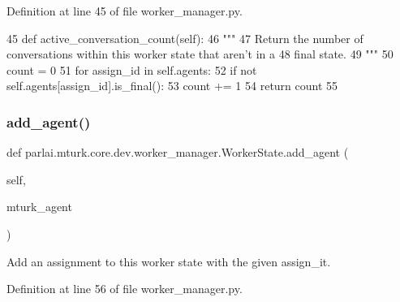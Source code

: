 Definition at line 45 of file worker\+\_\+manager.\+py.


\begin{DoxyCode}
45     \textcolor{keyword}{def }active\_conversation\_count(self):
46         \textcolor{stringliteral}{"""}
47 \textcolor{stringliteral}{        Return the number of conversations within this worker state that aren't in a}
48 \textcolor{stringliteral}{        final state.}
49 \textcolor{stringliteral}{        """}
50         count = 0
51         \textcolor{keywordflow}{for} assign\_id \textcolor{keywordflow}{in} self.agents:
52             \textcolor{keywordflow}{if} \textcolor{keywordflow}{not} self.agents[assign\_id].is\_final():
53                 count += 1
54         \textcolor{keywordflow}{return} count
55 
\end{DoxyCode}
\mbox{\label{classparlai_1_1mturk_1_1core_1_1dev_1_1worker__manager_1_1WorkerState_a36a49c3444954cb32d3500c834dd8f6a}} 
\subsubsection{\texorpdfstring{add\+\_\+agent()}{add\_agent()}}
{\footnotesize\ttfamily def parlai.\+mturk.\+core.\+dev.\+worker\+\_\+manager.\+Worker\+State.\+add\+\_\+agent (\begin{DoxyParamCaption}\item[{}]{self,  }\item[{}]{mturk\+\_\+agent }\end{DoxyParamCaption})}

\begin{DoxyVerb}Add an assignment to this worker state with the given assign_it.
\end{DoxyVerb}
 

Definition at line 56 of file worker\+\_\+manager.\+py.


